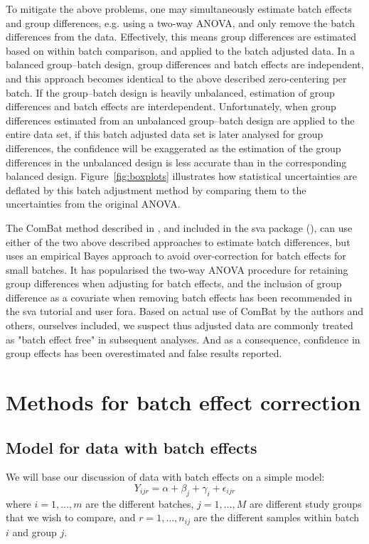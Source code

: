 \documentclass{bio}
\begin{document}
To mitigate the above problems, one may simultaneously estimate batch effects and group differences, e.g. using a two-way ANOVA, and only remove the batch differences from the data. Effectively, this means group differences are estimated based on within batch comparison, and applied to the batch adjusted data. In a balanced group--batch design, group differences and batch effects are independent, and this approach becomes identical to the above described zero-centering per batch. If the group--batch design is heavily unbalanced, estimation of group differences and batch effects are interdependent. Unfortunately, when group differences estimated from an unbalanced group--batch design are applied to the entire data set, if this batch adjusted data set is later analysed for group differences, the confidence will be exaggerated as the estimation of the group differences in the unbalanced design is less accurate than in the corresponding balanced design. Figure~\ref{fig:boxplots} illustrates how statistical uncertainties are deflated by this batch adjustment method by comparing them to the uncertainties from the original ANOVA.

The ComBat method described in \citet{Johnson2007}, and included in the sva package (\citealp{Leek2012}), can use either of the two above described approaches to estimate batch differences, but uses an empirical Bayes approach to avoid over-correction for batch effects for small batches. It has popularised the two-way ANOVA procedure for retaining group differences when adjusting for batch effects, and the inclusion of group difference as a covariate when removing batch effects has been recommended in the sva tutorial and user fora. Based on actual use of ComBat by the authors and others, ourselves included, we suspect thus adjusted data are commonly treated as "batch effect free" in subsequent analyses. And as a consequence, confidence in group effects has been overestimated and false results reported.

\section{Methods for batch effect correction}

\subsection{Model for data with batch effects}

We will base our discussion of data with batch effects on a simple model:
\begin{equation}
Y_{ijr}=\alpha+\beta_j+\gamma_i+\epsilon_{ijr}
\end{equation}
where $i=1,\ldots,m$ are the different batches, $j=1,\ldots,M$ are different study groups that we wish to compare, and $r=1,\ldots,n_{ij}$ are the different samples within batch $i$ and group $j$.
\end{document}
